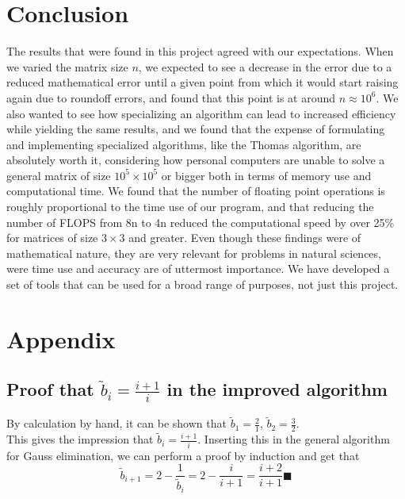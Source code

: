 \documentclass[10pt,a4paper]{article}
\begin{document}
\section{Conclusion}
The results that were found in this project agreed with our expectations. When we varied the matrix size $n$, we expected to see a decrease in the error due to a reduced mathematical error until a given point from which it would start raising again due to roundoff errors, and found that this point is at around $n \approx 10^6$. We also wanted to see how specializing an algorithm can lead to increased efficiency while yielding the same results, and we found that the expense of formulating and implementing specialized algorithms, like the Thomas algorithm, are absolutely worth it, considering how personal computers are unable to solve a general matrix of size $10^5\times10^5$ or bigger both in terms of memory use and computational time. We found that the number of floating point operations is roughly proportional to the time use of our program, and that reducing the number of FLOPS from 8n to 4n reduced the computational speed by over 25\% for matrices of size $3\times 3$ and greater. Even though these findings were of mathematical nature, they are very relevant for problems in natural sciences, were time use and accuracy are of uttermost importance. We have developed a set of tools that can be used for a broad range of purposes, not just this project.
\section{Appendix}
\subsection{Proof that $\tilde{b}_i=\frac{i+1}{i}$ in the improved algorithm}
By calculation by hand, it can be shown that  $\tilde{b}_1=\frac{2}{1}$,  $\tilde{b}_2=\frac{3}{2}$.\\
This gives the impression that  $\tilde{b}_i=\frac{i+1}{i}$.
Inserting this in the general algorithm for Gauss elimination, we can perform a proof by induction and get that
 $$\tilde{b}_{i+1}=2-\frac{1}{\tilde{b}_{i}}=2-\frac{i}{i+1}=\frac{i+2}{i+1} \blacksquare$$
\end{document}
